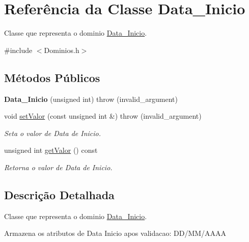 \hypertarget{class_data___inicio}{
\section{\-Referência da \-Classe \-Data\-\_\-\-Inicio}
\label{class_data___inicio}
}


\-Classe que representa o dominio \hyperlink{class_data___inicio}{\-Data\-\_\-\-Inicio}.  




{\ttfamily \#include $<$\-Dominios.\-h$>$}

\subsection*{\-Métodos \-Públicos}
\begin{DoxyCompactItemize}
\item 
\hypertarget{class_data___inicio_a06c1030d303ff22ba6d56f37e2777022}{
{\bfseries \-Data\-\_\-\-Inicio} (unsigned int)  throw (invalid\-\_\-argument)}
\label{class_data___inicio_a06c1030d303ff22ba6d56f37e2777022}

\item 
void \hyperlink{class_data___inicio_a9120a3bac68b85c6b9e625e7e3e510a5}{set\-Valor} (const unsigned int \&)  throw (invalid\-\_\-argument)
\begin{DoxyCompactList}\small\item\em \-Seta o valor de \-Data de \-Inicio. \end{DoxyCompactList}\item 
unsigned int \hyperlink{class_data___inicio_a31ec34b69439996c14d443c5687e9565}{get\-Valor} () const 
\begin{DoxyCompactList}\small\item\em \-Retorna o valor de \-Data de \-Inicio. \end{DoxyCompactList}\end{DoxyCompactItemize}


\subsection{\-Descrição \-Detalhada}
\-Classe que representa o dominio \hyperlink{class_data___inicio}{\-Data\-\_\-\-Inicio}. 

\-Armazena os atributos de \-Data \-Inicio apos validacao\-: \-D\-D/\-M\-M/\-A\-A\-A\-A 

